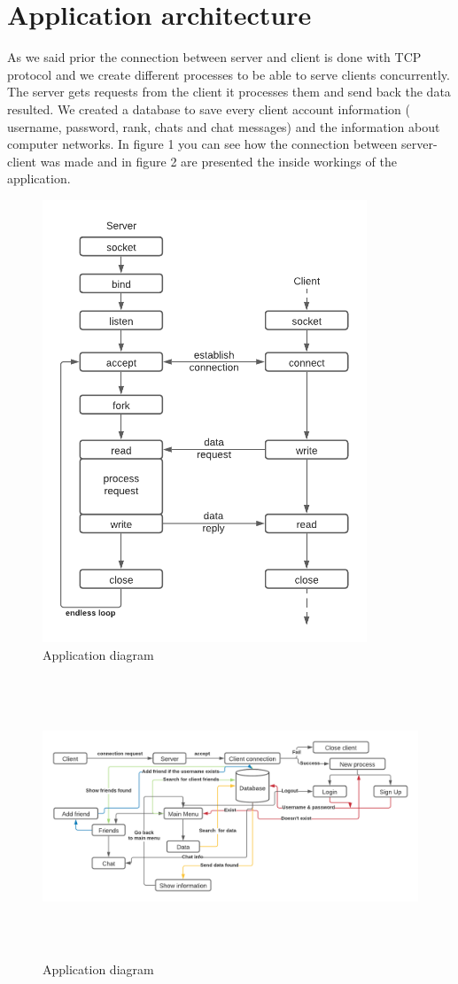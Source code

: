 \documentclass[runningheads]{llncs}
\begin{document}
\section{Application architecture}
\par As we said prior the connection between server and client is done with TCP protocol and we create different processes to be able to serve clients concurrently. The server gets requests from the client it processes them and send back the data resulted. We created a database to save every client account information ( username, password, rank, chats and chat messages) and the information about computer networks. In figure 1 you can see how the connection between server-client was made and in figure 2 are presented the inside workings of the application. 

\begin{figure}[H]
\includegraphics[width=\textwidth, height=5.2in]{images/client-server.png}
\caption{Application diagram}
\end{figure}
\begin{figure}[H]
\includegraphics[width=6.6in, height=3.3in]{images/application.png}
\caption{Application diagram}
\end{figure}
\end{document}

